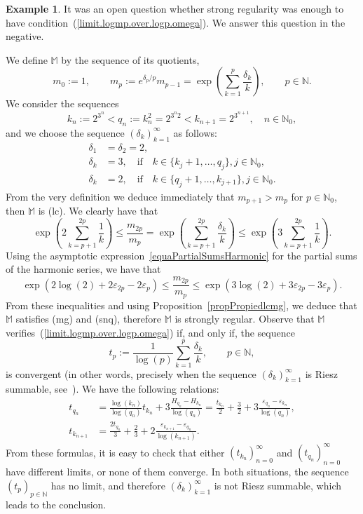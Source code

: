 \documentclass[11pt,a4paper]{article}
\theoremstyle{definition}
\newtheorem{exam}[theo]{Example}
\def\oo{\infty}
\def\de{\delta}
\def\ep{\varepsilon}
\def\N{\mathbb{N}}
\def\M{\mathbb{M}}
\begin{document}
\begin{exam}\label{exampleNoAdmiteOrden}
It was an open question whether strong regularity was enough to have condition~(\ref{limit.logmp.over.logp.omega}). We answer this question in the negative.

We define $\M$ by the sequence of its quotients,
 $$m_0:=1, \qquad m_p:=e^{\de_p/p}m_{p-1}=\exp\left(\sum^p_{k=1}\frac{\de_k}{k} \right), \qquad p\in\N.$$
We consider the sequences
 $$k_{n}:=2^{3^n} <q_{n}:=k^2_n=2^{ 3^n 2}< k_{n+1}=2^{3^{n+1}}, \quad{n\in\N_0},$$
and we choose the sequence $(\de_k)^\oo_{k=1}$ as follows:
\begin{align*}
\de_1&=\de_2=2, \\
\de_k&=3,\quad \text{if} \quad k\in \{k_j+1, \dots, q_j\}, j\in\N_0,\\
\de_k&=2,\quad \text{if} \quad k\in \{q_j+1, \dots, k_{j+1}\}, j\in\N_0.
\end{align*}
From the very definition we deduce immediately that $m_{p+1}>m_p$ for $p\in\N_0$, then $\M$ is (lc).
We clearly have that
$$\exp\left(2 \sum^{2p}_{k=p+1}\frac{1}{k} \right)\leq\frac{m_{2p}}{m_p}=\exp\left( \sum^{2p}_{k=p+1}\frac{\de_k}{k} \right)
\leq \exp\left( 3\sum^{2p}_{k=p+1}\frac{1}{k} \right).$$
Using the asymptotic expression~\eqref{equaPartialSumsHarmonic} for the partial sums of the harmonic series,
we have that
$$\exp\left(2 \log(2)+2\ep_{2p}-2\ep_p\right)\leq\frac{m_{2p}}{m_p}
\leq \exp\left( 3 \log(2)+3\ep_{2p}-3\ep_p\right).$$
From these inequalities and using Proposition~\ref{propPropiedlcmg}, we deduce that $\M$ satisfies (mg) and (snq), therefore $\M$ is strongly regular. Observe that $\M$ verifies~(\ref{limit.logmp.over.logp.omega}) if, and only if, the sequence
$$t_p:=\frac{1}{\log(p)}\sum^p_{k=1}\frac{\de_k}{k},\qquad p\in\N,$$
is convergent (in other words, precisely when the sequence $(\de_k)^\oo_{k=1}$ is Riesz summable, see~\cite{Boos}).
We have the following relations:
\begin{align*}
t_{q_n}&=\frac{\log(k_{n})}{\log(q_n)}t_{k_n}+ 3 \frac{H_{q_n}-H_{k_n}}{\log(q_n)}=\frac{t_{k_n}}{2}+ \frac{3}{2}
+3\frac{\ep_{q_n}-\ep_{k_n}}{\log(q_n)},\\
t_{k_{n+1}}&=\frac{2t_{q_n}}{3}+ \frac{2}{3}+2\frac{\ep_{k_{n+1}}-\ep_{q_n}}{\log(k_{n+1})}.
\end{align*}
From these formulas, it is easy  to check that either $(t_{k_n})^\oo_{n=0}$
and $(t_{q_n})^\oo_{n=0}$ have different limits, or none of them converge.
In both situations, the sequence $(t_p)_{p\in\N}$ has no limit, and therefore $(\de_k)^\oo_{k=1}$ is not Riesz summable, which
leads to the conclusion.
\end{exam}
\end{document}
